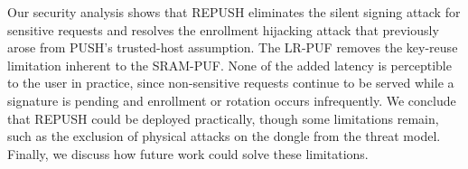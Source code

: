 Our security analysis shows that REPUSH eliminates the silent signing attack for sensitive requests and resolves the enrollment hijacking attack that previously arose from PUSH's trusted-host assumption. The LR-PUF removes the key-reuse limitation inherent to the SRAM-PUF. None of the added latency is perceptible to the user in practice, since non-sensitive requests continue to be served while a signature is pending and enrollment or rotation occurs infrequently. We conclude that REPUSH could be deployed practically, though some limitations remain, such as the exclusion of physical attacks on the dongle from the threat model. Finally, we discuss how future work could solve these limitations. 


